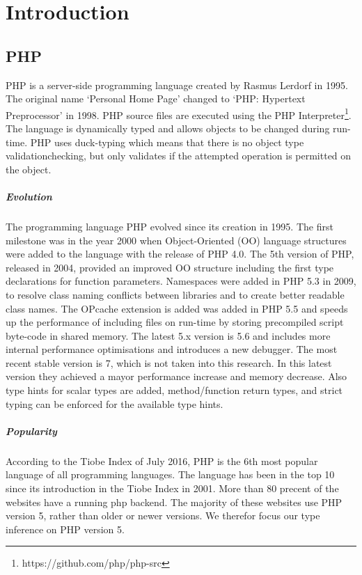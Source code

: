 \documentclass[../main.tex]{subfiles}
\begin{document}
    \chapter{Introduction}\label{ch:introduction}

    \section{PHP}
        PHP\footnotemark{} is a server-side programming language created by Rasmus Lerdorf in 1995.
        The original name `Personal Home Page' changed to `PHP: Hypertext Preprocessor' in 1998.
        PHP source files are executed using the PHP Interpreter\footnote{https://github.com/php/php-src}. 
        The language is dynamically typed and allows objects to be changed during run-time.
        PHP uses duck-typing which means that there is no object type validationchecking, but only validates if the attempted operation is permitted on the object.
        
        \paragraph{Evolution}
        The programming language PHP evolved since its creation in 1995.
        The first milestone was in the year 2000 when Object-Oriented (OO) language structures were added to the language with the release of PHP 4.0.
        The 5th version of PHP, released in 2004, provided an improved OO structure  including the first type declarations for function parameters.
        Namespaces were added in PHP 5.3 in 2009, to resolve class naming conflicts between libraries and to create better readable class names.
        The OPcache extension is added was added in PHP 5.5 and speeds up the performance of including files on run-time by storing precompiled script byte-code in shared memory.
        The latest 5.x version is 5.6 and includes more internal performance optimisations and introduces a new debugger.
        The most recent stable version is 7, which is not taken into this research.
        In this latest version they achieved a mayor performance increase and memory decrease.
        Also type hints for scalar types are added, method/function return types, and strict typing can be enforced for the available type hints.
       
        \paragraph{Popularity}
        According to the Tiobe Index\footnotemark{} of July 2016, PHP is the 6th most popular language of all programming languages.
        The language has been in the top 10 since its introduction in the Tiobe Index in 2001.
        More than 80 precent of the websites have a running php backend\footnotemark{}.
        The majority of these websites use PHP version 5, rather than older or newer versions.
        We therefor focus our type inference on PHP version 5.
\end{document}
